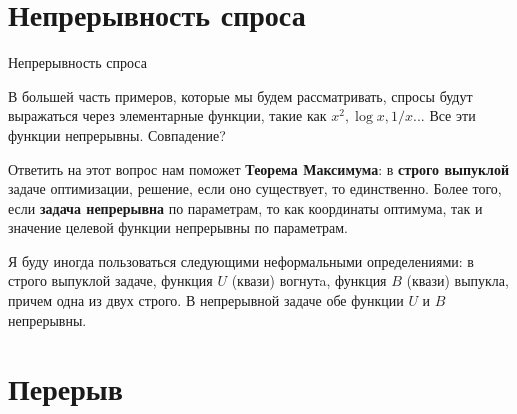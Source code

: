 \documentclass{beamer}
\begin{document}
\section{Непрерывность спроса}

\begin{frame}{Непрерывность спроса}

В большей часть примеров, которые мы будем рассматривать, спросы будут выражаться через элементарные функции, такие как $x^2, \log x, 1/x$... Все эти функции непрерывны. Совпадение?

Ответить на этот вопрос нам поможет \textbf{Теорема Максимума}: в \textbf{строго выпуклой} задаче оптимизации, решение, если оно существует, то единственно. Более того, если \textbf{задача непрерывна} по параметрам, то как координаты оптимума, так и значение целевой функции непрерывны по параметрам.

Я буду иногда пользоваться следующими неформальными определениями: в строго выпуклой задаче, функция $U$ (квази) вогнутa, функция $B$ (квази) выпукла, причем одна из двух строго. В непрерывной задаче обе функции $U$ и $B$ непрерывны.

\end{frame}

\section{Перерыв}
\end{document}

